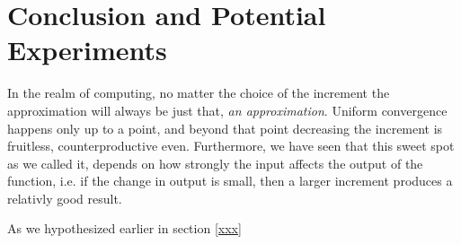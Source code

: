 \section{Conclusion and Potential Experiments}

In the realm of computing, no matter the choice of the increment the approximation will always be just that, \textit{an approximation}. Uniform convergence happens only up to a point, and beyond that point decreasing the increment is fruitless, counterproductive even. Furthermore, we have seen that this sweet spot as we called it, depends on how strongly the input affects the output of the function, i.e. if the change in output is small, then a larger increment produces a relativly good result.

As we hypothesized earlier in section \ref{xxx}